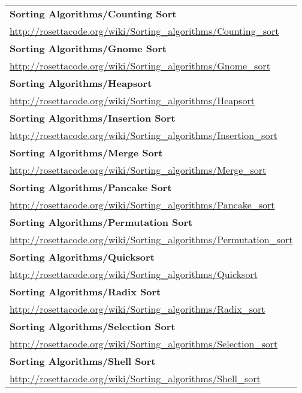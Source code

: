 \begin{longtable}{l}
\textbf{
Sorting Algorithms/Counting Sort } \\ \href{http://rosettacode.org/wiki/Sorting\_algorithms/Counting\_sort}{http://rosettacode.org/wiki/Sorting\_algorithms/Counting\_sort} \\
\textbf{Sorting Algorithms/Gnome Sort } \\ \href{http://rosettacode.org/wiki/Sorting\_algorithms/Gnome\_sort}{http://rosettacode.org/wiki/Sorting\_algorithms/Gnome\_sort} \\
\textbf{
Sorting Algorithms/Heapsort } \\ \href{http://rosettacode.org/wiki/Sorting\_algorithms/Heapsort}{http://rosettacode.org/wiki/Sorting\_algorithms/Heapsort} \\
\textbf{Sorting Algorithms/Insertion Sort } \\ \href{http://rosettacode.org/wiki/Sorting\_algorithms/Insertion\_sort}{http://rosettacode.org/wiki/Sorting\_algorithms/Insertion\_sort} \\
\textbf{
Sorting Algorithms/Merge Sort } \\ \href{http://rosettacode.org/wiki/Sorting\_algorithms/Merge\_sort}{http://rosettacode.org/wiki/Sorting\_algorithms/Merge\_sort} \\
\textbf{Sorting Algorithms/Pancake Sort } \\ \href{http://rosettacode.org/wiki/Sorting\_algorithms/Pancake\_sort}{http://rosettacode.org/wiki/Sorting\_algorithms/Pancake\_sort} \\
\textbf{
Sorting Algorithms/Permutation Sort } \\ \href{http://rosettacode.org/wiki/Sorting\_algorithms/Permutation\_sort}{http://rosettacode.org/wiki/Sorting\_algorithms/Permutation\_sort} \\
\textbf{Sorting Algorithms/Quicksort } \\ \href{http://rosettacode.org/wiki/Sorting\_algorithms/Quicksort}{http://rosettacode.org/wiki/Sorting\_algorithms/Quicksort} \\
\textbf{
Sorting Algorithms/Radix Sort } \\ \href{http://rosettacode.org/wiki/Sorting\_algorithms/Radix\_sort}{http://rosettacode.org/wiki/Sorting\_algorithms/Radix\_sort} \\
\textbf{Sorting Algorithms/Selection Sort } \\ \href{http://rosettacode.org/wiki/Sorting\_algorithms/Selection\_sort}{http://rosettacode.org/wiki/Sorting\_algorithms/Selection\_sort} \\
\textbf{
Sorting Algorithms/Shell Sort } \\ \href{http://rosettacode.org/wiki/Sorting\_algorithms/Shell\_sort}{http://rosettacode.org/wiki/Sorting\_algorithms/Shell\_sort} \\

\end{longtable}
